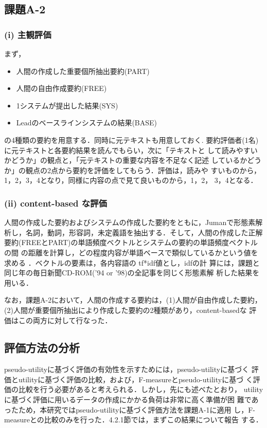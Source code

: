 \subsection*{課題A-2}

   \subsubsection*{(i) 主観評価}

まず，
\begin{itemize}
 \item 人間の作成した重要個所抽出要約(PART)
 \item 人間の自由作成要約(FREE)
 \item 1システムが提出した結果(SYS)
 \item Leadのベースラインシステムの結果(BASE)
\end{itemize}
の4種類の要約を用意する．同時に元テキストも用意しておく.
要約評価者(1名)に元テキストと各要約結果を読んでもらい，次に「テキストと
して読みやすいかどうか」の観点と，「元テキストの重要な内容を不足なく記述
しているかどうか」の観点の2点から要約を評価をしてもらう．評価は，読みや
すいものから，1，2，3，4となり，同様に内容の点で見て良いものから，1，2，
3，4となる．

\subsubsection*{(ii) content-based な評価}

人間の作成した要約およびシステムの作成した要約をともに，Jumanで形態素解
析し，名詞，動詞，形容詞，未定義語を抽出する．そして，人間の作成した正解
要約(FREEとPART)の単語頻度ベクトルとシステムの要約の単語頻度ベクトルの間
の距離を計算し，どの程度内容が単語ベースで類似しているかという値を求める
\cite{Donaway:2000}．ベクトルの要素は，各内容語の tf*idf値とし，idfの計
算には，課題と同じ年の毎日新聞CD-ROM('94 or '98)の全記事を同じく形態素解
析した結果を用いる．

なお，課題A-2において，人間の作成する要約は，(1)人間が自由作成した要約，
(2)人間が重要個所抽出により作成した要約の2種類があり，content-basedな
評価はこの両方に対して行なった．

\subsection{評価方法の分析}


pseudo-utilityに基づく評価の有効性を示すためには，pseudo-utilityに基づく
評価とutilityに基づく評価の比較，および，F-measureとpseudo-utilityに基づ
く評価の比較を行う必要があると考えられる．しかし，先にも述べたとおり，
utilityに基づく評価に用いるデータの作成にかかる負荷は非常に高く準備が困
難であったため，本研究ではpseudo-utilityに基づく評価方法を課題A-1に適用
し，F-measureとの比較のみを行った．4.2.1節では，まずこの結果について報告
する．


